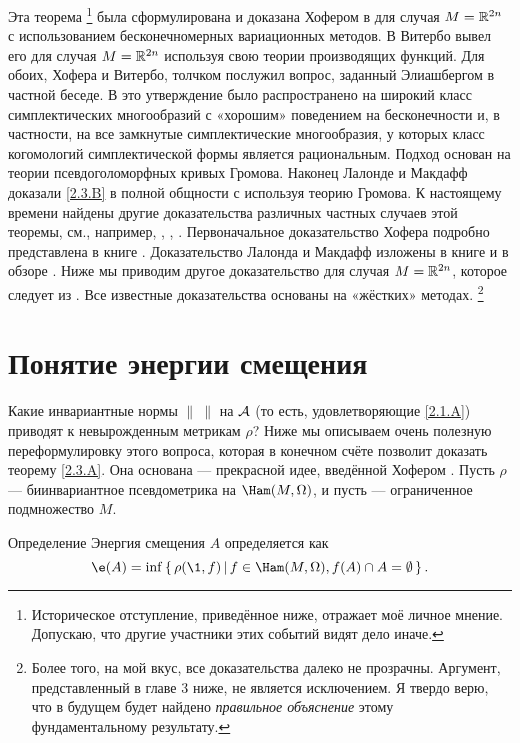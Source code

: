 Эта теорема%
\footnote{Историческое отступление, приведённое ниже, отражает моё личное мнение.
Допускаю, что другие участники этих событий видят дело иначе.}
была сформулирована и доказана Хофером в \cite{H1} для случая $M = \mathbb{R}^{2n}$ с использованием бесконечномерных вариационных методов.
В \cite{V1} Витербо вывел его для случая $M = \mathbb{R}^{2n}$ используя свою теории производящих функций.
Для обоих, Хофера и Витербо, толчком послужил вопрос, заданный Элиашбергом в частной беседе.
В \cite{P1} это утверждение было распространено на широкий класс симплектических многообразий с «хорошим» поведением на бесконечности и, в частности, на все замкнутые симплектические многообразия, у которых класс когомологий симплектической формы является рациональным.
Подход \cite{P1} основан на теории псевдоголоморфных кривых Громова.
Наконец \cite{LM1} Лалонде и Макдафф доказали \ref{2.3.B} в полной общности с используя теорию Громова.
К настоящему времени найдены другие доказательства различных частных случаев этой теоремы, см., например, \cite{Ch}, \cite{O3}, \cite{Sch3}.
Первоначальное доказательство Хофера подробно представлена в книге
\cite{HZ}.
Доказательство Лалонда и Макдафф изложены в книге \cite{MS} и в обзоре \cite{L}.
Ниже мы приводим другое доказательство для случая $M = \mathbb{R}^{2n}$, которое следует из \cite{P1}.
Все известные доказательства основаны на «жёстких» методах.%
\footnote{Более того, на мой вкус, все доказательства далеко не прозрачны.
Аргумент, представленный в главе 3 ниже, не является исключением.
Я твердо верю, что в будущем будет найдено \emph{правильное объяснение} этому фундаментальному результату.}

\section{Понятие энергии смещения}\label{2.4}

Какие инвариантные нормы $\|\ \|$ на $\mathcal{A}$ (то есть, удовлетворяющие \ref{2.1.A}) приводят к невырожденным метрикам $\rho$?
Ниже мы описываем очень полезную переформулировку этого вопроса, которая в конечном счёте позволит доказать теорему \ref{2.3.A}.
Она основана  --- прекрасной идее, введённой Хофером \cite{H1}.
Пусть $\rho$ --- биинвариантное псевдометрика на $\Ham (M, \Omega)$, и пусть  --- ограниченное подмножество $M$.

\begin{thm*}{Определение}
Энергия смещения $A$ определяется как
\[\e(A) = \inf \set{\rho (\1, f)}{f \in \Ham (M, \Omega), f (A) \cap A = \emptyset}.\]
\end{thm*}


